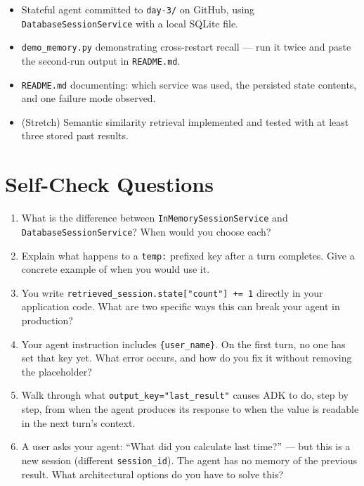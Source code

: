 \documentclass[12pt, a4paper]{article}
\begin{document}
\begin{delivbox}
\begin{itemize}[leftmargin=*, itemsep=3pt]
  \item Stateful agent committed to \texttt{day-3/} on GitHub, using
    \texttt{DatabaseSessionService} with a local SQLite file.
  \item \texttt{demo\_memory.py} demonstrating cross-restart recall --- run it
    twice and paste the second-run output in \texttt{README.md}.
  \item \texttt{README.md} documenting: which service was used, the persisted
    state contents, and one failure mode observed.
  \item (Stretch) Semantic similarity retrieval implemented and tested with at
    least three stored past results.
\end{itemize}
\end{delivbox}

\vspace{1.5em}

\section{Self-Check Questions}

\begin{enumerate}[leftmargin=*, label=\textbf{Q\arabic*.}, itemsep=6pt]
  \item What is the difference between \texttt{InMemorySessionService} and
    \texttt{DatabaseSessionService}? When would you choose each?

  \item Explain what happens to a \texttt{temp:} prefixed key after a turn
    completes. Give a concrete example of when you would use it.

  \item You write \texttt{retrieved\_session.state["count"] += 1} directly in
    your application code. What are two specific ways this can break your agent
    in production?

  \item Your agent instruction includes \texttt{\{user\_name\}}. On the first
    turn, no one has set that key yet. What error occurs, and how do you fix it
    without removing the placeholder?

  \item Walk through what \texttt{output\_key="last\_result"} causes ADK to do,
    step by step, from when the agent produces its response to when the value is
    readable in the next turn's context.

  \item A user asks your agent: ``What did you calculate last time?'' --- but
    this is a new session (different \texttt{session\_id}). The agent has no
    memory of the previous result. What architectural options do you have to
    solve this?
\end{enumerate}
\end{document}
